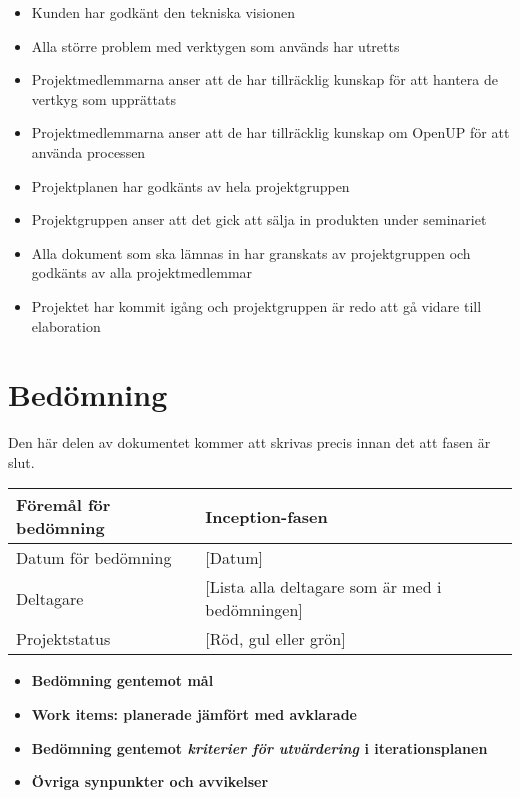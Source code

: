 \begin{itemize}
	\item Kunden har godkänt den tekniska visionen
	\item Alla större problem med verktygen som används har utretts
	\item Projektmedlemmarna anser att de har tillräcklig kunskap för att hantera de vertkyg som upprättats
	\item Projektmedlemmarna anser att de har tillräcklig kunskap om OpenUP för att använda processen
	\item Projektplanen har godkänts av hela projektgruppen
	\item Projektgruppen anser att det gick att sälja in produkten under seminariet
	\item Alla dokument som ska lämnas in har granskats av projektgruppen och godkänts av alla projektmedlemmar
	\item Projektet har kommit igång och projektgruppen är redo att gå vidare till elaboration
\end{itemize}

\section{Bedömning}
Den här delen av dokumentet kommer att skrivas precis innan det att fasen är slut.

\begin{center}
	\begin{tabular}{| l | l |}
		\hline Föremål för bedömning & Inception-fasen \\
		\hline Datum för bedömning & [Datum] \\
		\hline Deltagare & [Lista alla deltagare som är med i bedömningen] \\
		\hline Projektstatus & [Röd, gul eller grön] \\
		\hline
	\end{tabular}
\end{center}

\begin{itemize}
	\item \textbf{Bedömning gentemot mål}
	\item \textbf{Work items: planerade jämfört med avklarade}
	\item \textbf{Bedömning gentemot \textit{kriterier för utvärdering} i iterationsplanen}
	\item \textbf{Övriga synpunkter och avvikelser}
\end{itemize}



